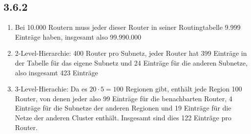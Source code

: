 \documentclass[a4paper,
			llpt,
			solution,
			accentcolor=tud2d,
			colorbacktitle
			]
			{tudexercise}
\newcommand{\8}{$\infty$}
\begin{document}
\subsection{3.6.2}
\begin{enumerate}
\item Bei 10.000 Routern muss jeder dieser Router in seiner Routingtabelle 9.999 Einträge haben, insgesamt also 99.990.000
\item 2-Level-Hierarchie: 400 Router pro Subnetz, jeder Router hat 399 Einträge in der Tabelle für das eigene Subnetz und 24 Einträge für die anderen Subnetze, also insgesamt 423 Einträge
\item 3-Level-Hierachie: Da es $20 \cdot 5 = 100$ Regionen gibt, enthält jede Region 100 Router, von denen jeder also 99 Einträge für die benachbarten Router, 4 Einträge für die Subnetze der anderen Regionen und 19 Einträge für die Netze der anderen Cluster enthält. Insgesamt sind dies 122 Einträge pro Router.
\end{enumerate}
\end{document}
